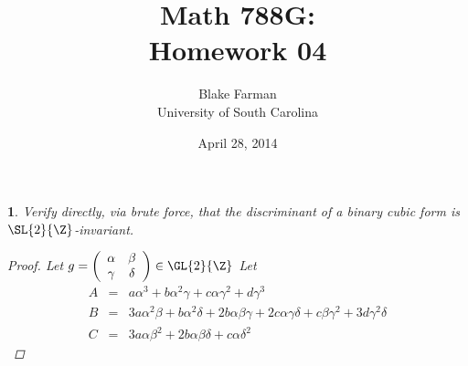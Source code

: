 \documentclass[10pt]{amsart}
\author{Blake Farman\\University of South Carolina}
\title{Math 788G:\\Homework 04}
\date{April 28, 2014}
\begin{document}
\maketitle

\providecommand{\p}{\mathfrak{p}}
\providecommand{\m}{\mathfrak{m}}
\providecommand{\Deck}[1]{\operatorname{Deck}\left(#1\right)}
\newtheorem{thm}{}
\newtheorem{lem}{Lemma}
\newtheorem{prop}{Proposition}
\theoremstyle{definition}
\newtheorem{defn}{Definition}[thm]

\newcommand{\A}{\mathbb{A}}

\begin{thm}\label{Ex1}
  Verify directly, via brute force, that the discriminant of a binary cubic form is $\SL{2}{\Z}$-invariant.
  \begin{proof}
    Let $g = \left(\begin{array}{cc} \alpha & \beta \\ \gamma & \delta\end{array}\right) \in \GL{2}{\Z}$
      Let
  \begin{eqnarray*}
    A &=& a\alpha^{3} 
        + b \alpha^{2} \gamma 
        + c \alpha  \gamma^{2} 
        + d \gamma^{3}\\ 
    B &=& 3 a \alpha^{2} \beta 
        + b \alpha^{2}  \delta 
        + 2 b \alpha \beta \gamma 
        + 2 c \alpha \gamma \delta 
        + c \beta \gamma^{2} 
        + 3 d \gamma^{2} \delta\\
    C &=& 3 a \alpha\beta^{2} 
        + 2 b \alpha \beta \delta 
        + c \alpha \delta^{2} 

\end{eqnarray*}
\end{proof}
\end{thm}
\end{document}
